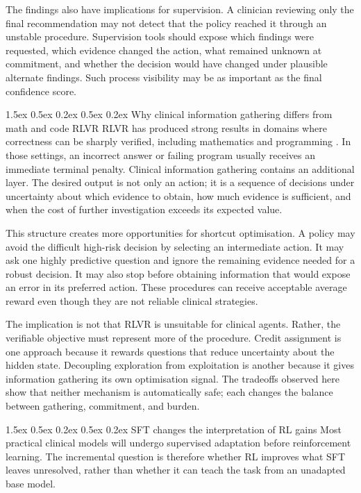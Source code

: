 \documentclass{article}
\makeatletter
\renewcommand{\paragraph}{%
  \@startsection{paragraph}{4}{\z@}%
                {1.5ex \@plus 0.5ex \@minus 0.2ex}%
                {0.5ex \@plus 0.2ex}%
                {\normalsize\bf}}
\makeatother
\begin{document}
The findings also have implications for supervision. A clinician reviewing only
the final recommendation may not detect that the policy reached it through an
unstable procedure. Supervision tools should expose which findings were requested,
which evidence changed the action, what remained unknown at commitment, and
whether the decision would have changed under plausible alternate findings. Such
process visibility may be as important as the final confidence score.

\paragraph{Why clinical information gathering differs from math and code RLVR}
RLVR has produced strong results in domains where correctness can be sharply
verified, including mathematics and programming
\citep{shao2024deepseekmath}. In those settings, an incorrect answer or failing
program usually receives an immediate terminal penalty. Clinical information
gathering contains an additional layer. The desired output is not only an action;
it is a sequence of decisions under uncertainty about which evidence to obtain,
how much evidence is sufficient, and when the cost of further investigation
exceeds its expected value.

This structure creates more opportunities for shortcut optimisation. A policy may
avoid the difficult high-risk decision by selecting an intermediate action. It may
ask one highly predictive question and ignore the remaining evidence needed for a
robust decision. It may also stop before obtaining information that would expose
an error in its preferred action. These procedures can receive acceptable average
reward even though they are not reliable clinical strategies.

The implication is not that RLVR is unsuitable for clinical agents. Rather, the
verifiable objective must represent more of the procedure. Credit assignment is
one approach because it rewards questions that reduce uncertainty about the hidden
state. Decoupling exploration from exploitation is another because it gives
information gathering its own optimisation signal. The tradeoffs observed here
show that neither mechanism is automatically safe; each changes the balance
between gathering, commitment, and burden.

\paragraph{SFT changes the interpretation of RL gains}
Most practical clinical models will undergo supervised adaptation before
reinforcement learning. The incremental question is therefore whether RL improves
what SFT leaves unresolved, rather than whether it can teach the task from an
unadapted base model.
\end{document}
